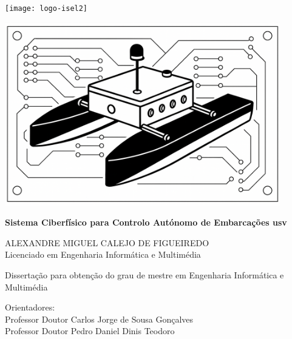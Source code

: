 
\linespread{1.0}

\begin{titlepage}
	\vspace*{-2.0cm}
	\begin{center}
		\texttt{[image: logo-isel2]}\\\vspace{6pt}
	\end{center}
	
	\begin{center}
		\includegraphics[width=12cm]{figuras/usv-2d.png}
	\end{center}\vspace{6pt}
	
	\begin{center}
		\LARGE
		\textbf{Sistema Ciberfísico para Controlo Autónomo de Embarcações \acrlong{usv}}\\\vspace{24pt}
		
		\Large
		ALEXANDRE MIGUEL CALEJO DE FIGUEIREDO\\
		\large
		Licenciado em Engenharia Informática e Multimédia\\\vspace{24pt}
		
		\normalsize
		Dissertação para obtenção do grau de mestre em Engenharia Informática e Multimédia
	\end{center}\vspace{12pt}
	
	\normalsize
	\noindent\hspace*{3.5cm}
	Orientadores:\\
	\noindent\hspace*{5.5cm}
	Professor Doutor Carlos Jorge de Sousa Gonçalves\\
	\noindent\hspace*{5.5cm}
	Professor Doutor Pedro Daniel Dinis Teodoro\\
	

\end{titlepage}

